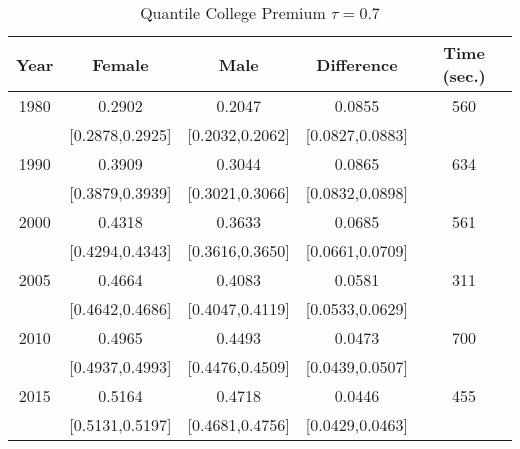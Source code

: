 \begin{table}[ht]
\centering
\begin{tabular}{ccccc}
  \hline
Year & Female & Male & Difference & Time (sec.) \\ 
  \hline
1980 & 0.2902 & 0.2047 & 0.0855 & 560 \\ 
   & [0.2878,0.2925] & [0.2032,0.2062] & [0.0827,0.0883] &  \\ 
  1990 & 0.3909 & 0.3044 & 0.0865 & 634 \\ 
   & [0.3879,0.3939] & [0.3021,0.3066] & [0.0832,0.0898] &  \\ 
  2000 & 0.4318 & 0.3633 & 0.0685 & 561 \\ 
   & [0.4294,0.4343] & [0.3616,0.3650] & [0.0661,0.0709] &  \\ 
  2005 & 0.4664 & 0.4083 & 0.0581 & 311 \\ 
   & [0.4642,0.4686] & [0.4047,0.4119] & [0.0533,0.0629] &  \\ 
  2010 & 0.4965 & 0.4493 & 0.0473 & 700 \\ 
   & [0.4937,0.4993] & [0.4476,0.4509] & [0.0439,0.0507] &  \\ 
  2015 & 0.5164 & 0.4718 & 0.0446 & 455 \\ 
   & [0.5131,0.5197] & [0.4681,0.4756] & [0.0429,0.0463] &  \\ 
   \hline
\end{tabular}
\caption{Quantile College Premium $\tau=0.7$} 
\end{table}
